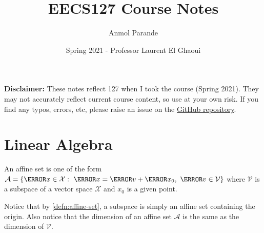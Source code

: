 

\title{EECS127 Course Notes}
\author{Anmol Parande}
\date{Spring 2021 - Professor Laurent El Ghaoui}
\maketitle
\textbf{Disclaimer: }These notes reflect 127 when I took the course (Spring 2021). They may not accurately reflect current course content, so use at your own risk.
If you find any typos, errors, etc, please raise an issue on the \href{https://github.com/parandea17/BerkeleyNotes}{GitHub repository}.
\tableofcontents
\newpage
\section{Linear Algebra}
\begin{definition}
  An affine set is one of the form $\mathcal{A}=\{ \V{x}\in\mathcal{X}:\ \V{x}=\V{v}+\V{x_0},\ \V{v}\in\mathcal{V}\}$ where $\mathcal{V}$ is a subspace of a vector space $\mathcal{X}$ and $x_0$ is a given point.
  \label{defn:affine-set}
\end{definition}
Notice that by \cref{defn:affine-set}, a subspace is simply an affine set containing the origin. Also notice that the dimension of an affine set $\mathcal{A}$ is the same as the dimension of $\mathcal{V}$.
